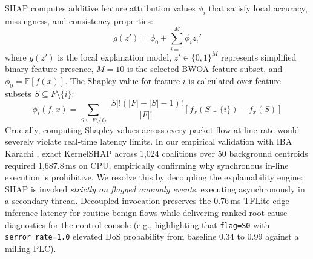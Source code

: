 \documentclass[conference]{IEEEtran}
\begin{document}
SHAP computes additive feature attribution values $\phi_i$ that satisfy local accuracy, missingness, and consistency properties:
\begin{equation}
g(z') = \phi_0 + \sum_{i=1}^M \phi_i z_i'
\end{equation}
where $g(z')$ is the local explanation model, $z' \in \{0, 1\}^M$ represents simplified binary feature presence, $M = 10$ is the selected BWOA feature subset, and $\phi_0 = \mathbb{E}[f(x)]$. The Shapley value for feature $i$ is calculated over feature subsets $S \subseteq F \setminus \{i\}$:
\begin{equation}
\phi_i(f, x) = \sum_{S \subseteq F \setminus \{i\}} \frac{|S|!(|F| - |S| - 1)!}{|F|!} \left[ f_x(S \cup \{i\}) - f_x(S) \right]
\end{equation}
Crucially, computing Shapley values across every packet flow at line rate would severely violate real-time latency limits. In our empirical validation with IBA Karachi \cite{uddin2026shap}, exact KernelSHAP across 1,024 coalitions over 50 background centroids required 1,687.8\,ms on CPU, empirically confirming why synchronous in-line execution is prohibitive. We resolve this by decoupling the explainability engine: SHAP is invoked \emph{strictly on flagged anomaly events}, executing asynchronously in a secondary thread. Decoupled invocation preserves the 0.76\,ms TFLite edge inference latency for routine benign flows while delivering ranked root-cause diagnostics for the control console (e.g., highlighting that \texttt{flag=S0} with \texttt{serror\_rate=1.0} elevated DoS probability from baseline 0.34 to 0.99 against a milling PLC).
\end{document}
